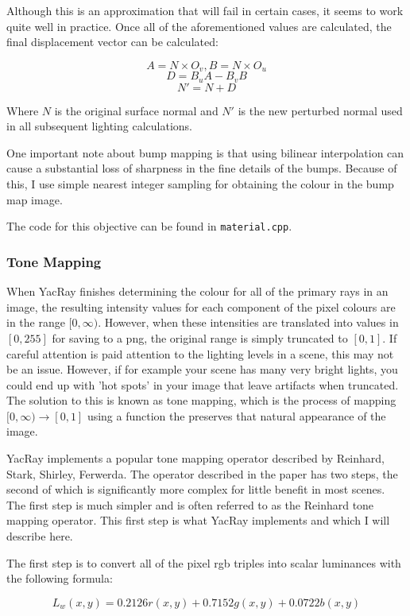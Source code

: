 \documentclass[12pt]{article}
\begin{document}
Although this is an approximation that will fail in certain cases, it seems to work quite well in practice. Once all of the aforementioned values are calculated, the final displacement vector can be calculated:

$$A=N\times O_v, B=N\times O_u$$
$$D=B_uA-B_vB$$
$$N'=N+D$$

Where $N$ is the original surface normal and $N'$ is the new perturbed normal used in all subsequent lighting calculations.

One important note about bump mapping is that using bilinear interpolation can cause a substantial loss of sharpness in the fine details of the bumps. Because of this, I use simple nearest integer sampling for obtaining the colour in the bump map image.

The code for this objective can be found in \texttt{material.cpp}.

\subsubsection{Tone Mapping}

When YacRay finishes determining the colour for all of the primary rays in an image, the resulting intensity values for each component of the pixel colours are in the range $[0,\infty)$. However, when these intensities are translated into values in $[0,255]$ for saving to a png, the original range is simply truncated to $[0,1]$. If careful attention is paid attention to the lighting levels in a scene, this may not be an issue. However, if for example your scene has many very bright lights, you could end up with 'hot spots' in your image that leave artifacts when truncated. The solution to this is known as tone mapping, which is the process of mapping $[0,\infty)\to[0,1]$ using a function the preserves that natural appearance of the image.

YacRay implements a popular tone mapping operator described by Reinhard, Stark, Shirley, Ferwerda\cite{tone}. The operator described in the paper has two steps, the second of which is significantly more complex for little benefit in most scenes. The first step is much simpler and is often referred to as the Reinhard tone mapping operator. This first step is what YacRay implements and which I will describe here.

The first step is to convert all of the pixel rgb triples into scalar luminances with the following formula:

$$L_w(x,y)=0.2126r(x,y)+0.7152g(x,y)+0.0722b(x,y)$$
\end{document}
